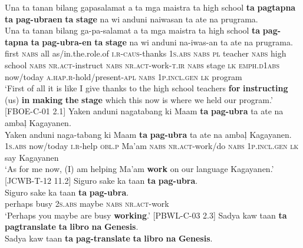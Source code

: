 \ea
\label{bkm:Ref115164893}
Una  ta  tanan  bilang  gapasalamat  a  ta  mga  maistra ta  high  school  \textbf{ta}  \textbf{pagtapna}  \textbf{ta}  \textbf{pag-ubraen} \textbf{ta}  \textbf{stage}  na  wi  anduni  naiwasan ta  ate  na  prugrama. \smallskip\\
\gll Una  ta  tanan  bilang  ga-pa-salamat  a  ta  mga  maistra ta  high  school  \textbf{ta}  \textbf{pag-tapna}  \textbf{ta}  \textbf{pag-ubra-en} \textbf{ta}  \textbf{stage}  na  wi  anduni  na-iwas-an ta  ate  na  prugrama. \\
first  \textsc{nabs}  all  as/in.the.role.of  \textsc{i.r}-\textsc{caus}-thanks  1\textsc{s.abs} \textsc{nabs}  \textsc{pl}  teacher
\textsc{nabs}  high  school  \textsc{nabs}  \textsc{nr.act}-instruct  \textsc{nabs}  \textsc{nr.act}-work-\textsc{t.ir}
\textsc{nabs}  stage  \textsc{lk}  \textsc{emph.d}1\textsc{abs}  now/today  \textsc{a.hap.r}-hold/present-\textsc{apl}
\textsc{nabs}  1\textsc{p.incl.gen}  \textsc{lk}  program \\
\glt `First of all it is like I give thanks to the high school teachers \textbf{for} \textbf{instructing} (us) \textbf{in} \textbf{making} \textbf{the} \textbf{stage} which this now is where we held our program.’ [FBOE-C-01 2.1]
\z
\ea
Yaken  anduni  nagatabang  ki  Maam  \textbf{ta}  \textbf{pag-ubra} ta  ate  na  ambaļ  Kagayanen. \smallskip\\
\gll Yaken  anduni  naga-tabang\footnotemark{}  ki  Maam  \textbf{ta}  \textbf{pag-ubra} ta  ate  na  ambaļ  Kagayanen. \\
1\textsc{s.abs}  now/today  \textsc{i.r}-help  \textsc{obl.p}  Ma’am  \textsc{nabs}  \textsc{nr.act}-work/do
\textsc{nabs}  1\textsc{p.incl.gen}  \textsc{lk}  say  Kagayanen \\
\glt `As for me now, (I) am helping Ma’am \textbf{work} on our language Kagayanen.’ [JCWB-T-12 11.2]
\z
\ea
Siguro  sake  ka  taan  \textbf{ta}  \textbf{pag-ubra}. \smallskip\\
\gll Siguro  sake  ka  taan  \textbf{ta}  \textbf{pag-ubra}. \\
perhaps  busy  2\textsc{s.abs}  maybe  \textsc{nabs}  \textsc{nr.act}-work \\
\glt ‘Perhaps you maybe are busy \textbf{working}.’ [PBWL-C-03 2.3]
\z
\ea
Sadya  kaw  taan  \textbf{ta}  \textbf{pagtranslate}   \textbf{ta}  \textbf{libro}  \textbf{na}  \textbf{Genesis}. \smallskip\\
\gll Sadya  kaw  taan  \textbf{ta}  \textbf{pag-translate}   \textbf{ta}  \textbf{libro}  \textbf{na}  \textbf{Genesis}. \\
